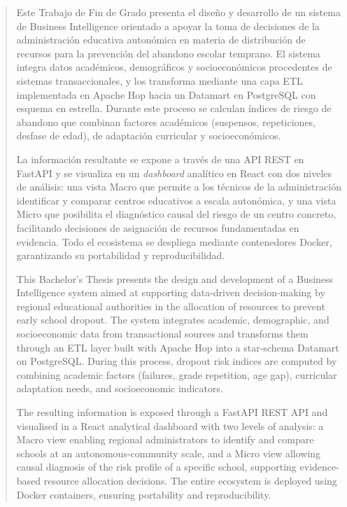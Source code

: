 
\pagestyle{empty}
\begin{abstract}
  Este Trabajo de Fin de Grado presenta el diseño y desarrollo de un sistema de Business Intelligence orientado a apoyar la toma de decisiones de la administración educativa autonómica en materia de distribución de recursos para la prevención del abandono escolar temprano. El sistema integra datos académicos, demográficos y socioeconómicos procedentes de sistemas transaccionales, y los transforma mediante una capa ETL implementada en Apache Hop hacia un Datamart en PostgreSQL con esquema en estrella. Durante este proceso se calculan índices de riesgo de abandono que combinan factores académicos (suspensos, repeticiones, desfase de edad), de adaptación curricular y socioeconómicos.

  La información resultante se expone a través de una API REST en FastAPI y se visualiza en un \textit{dashboard} analítico en React con dos niveles de análisis: una vista Macro que permite a los técnicos de la administración identificar y comparar centros educativos a escala autonómica, y una vista Micro que posibilita el diagnóstico causal del riesgo de un centro concreto, facilitando decisiones de asignación de recursos fundamentadas en evidencia. Todo el ecosistema se despliega mediante contenedores Docker, garantizando su portabilidad y reproducibilidad.

  \vspace*{25pt}
  \begin{segundoresumo}
    This Bachelor's Thesis presents the design and development of a Business Intelligence system aimed at supporting data-driven decision-making by regional educational authorities in the allocation of resources to prevent early school dropout. The system integrates academic, demographic, and socioeconomic data from transactional sources and transforms them through an ETL layer built with Apache Hop into a star-schema Datamart on PostgreSQL. During this process, dropout risk indices are computed by combining academic factors (failures, grade repetition, age gap), curricular adaptation needs, and socioeconomic indicators.

    The resulting information is exposed through a FastAPI REST API and visualised in a React analytical dashboard with two levels of analysis: a Macro view enabling regional administrators to identify and compare schools at an autonomous-community scale, and a Micro view allowing causal diagnosis of the risk profile of a specific school, supporting evidence-based resource allocation decisions. The entire ecosystem is deployed using Docker containers, ensuring portability and reproducibility.
  \end{segundoresumo}
\vspace*{25pt}

\end{abstract}
\pagestyle{fancy}

